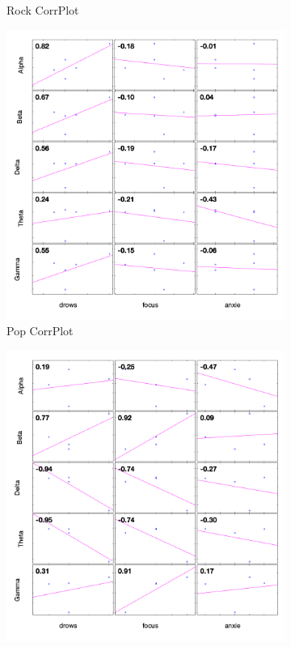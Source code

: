 \documentclass[9pt,twocolumn]{paper-template}
\begin{document}
\begin{figure}[!htbp]
\begin{subfigure}[b]{0.4\linewidth}
    \caption{Rock CorrPlot}
  \end{subfigure}
   \begin{subfigure}[b]{0.4\linewidth}
    \includegraphics[width=\linewidth]{figures/pop_corrplot.png}
    \caption{Pop CorrPlot}
  \end{subfigure}
   \begin{subfigure}[b]{0.4\linewidth}
    \includegraphics[width=\linewidth]{figures/opera_corrplot.png}

\end{subfigure}
\end{figure}
\end{document}
